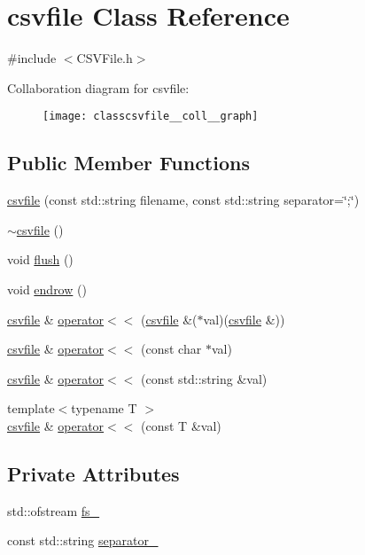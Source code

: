 \hypertarget{classcsvfile}{}\section{csvfile Class Reference}
\label{classcsvfile}


{\ttfamily \#include $<$C\+S\+V\+File.\+h$>$}



Collaboration diagram for csvfile\+:
\nopagebreak
\begin{figure}[H]
\begin{center}
\leavevmode
\texttt{[image: classcsvfile\_\_coll\_\_graph]}
\end{center}
\end{figure}
\subsection*{Public Member Functions}
\begin{DoxyCompactItemize}
\item 
\hyperlink{classcsvfile_a22aee506583f5fd125a8f8f3dcccff3b}{csvfile} (const std\+::string filename, const std\+::string separator=\char`\"{};\char`\"{})
\item 
\hyperlink{classcsvfile_ac4a1a4a15b040e0afd25978dc07c2954}{$\sim$csvfile} ()
\item 
void \hyperlink{classcsvfile_a5955a8c1fea1af1c95a388aac391fada}{flush} ()
\item 
void \hyperlink{classcsvfile_afd878cbd74e1be9aa7e33bdf7f70e9ef}{endrow} ()
\item 
\hyperlink{classcsvfile}{csvfile} \& \hyperlink{classcsvfile_aee44e4a9c1826eba97f476ba24572356}{operator$<$$<$} (\hyperlink{classcsvfile}{csvfile} \&($\ast$val)(\hyperlink{classcsvfile}{csvfile} \&))
\item 
\hyperlink{classcsvfile}{csvfile} \& \hyperlink{classcsvfile_a2b9cd9120377c5e325b8d33ac17c7497}{operator$<$$<$} (const char $\ast$val)
\item 
\hyperlink{classcsvfile}{csvfile} \& \hyperlink{classcsvfile_a3850513edbfe4b488cfd4a5bac2f15e6}{operator$<$$<$} (const std\+::string \&val)
\item 
{\footnotesize template$<$typename T $>$ }\\\hyperlink{classcsvfile}{csvfile} \& \hyperlink{classcsvfile_ad00150e1310d31fd4f27801e52a3d7a5}{operator$<$$<$} (const T \&val)
\end{DoxyCompactItemize}
\subsection*{Private Attributes}
\begin{DoxyCompactItemize}
\item 
std\+::ofstream \hyperlink{classcsvfile_af9d64cb504548e6bca5e8bf283ae6b00}{fs\+\_\+}
\item 
const std\+::string \hyperlink{classcsvfile_a93e4acb10aa1213d248b4113c99988ad}{separator\+\_\+}
\end{DoxyCompactItemize}


